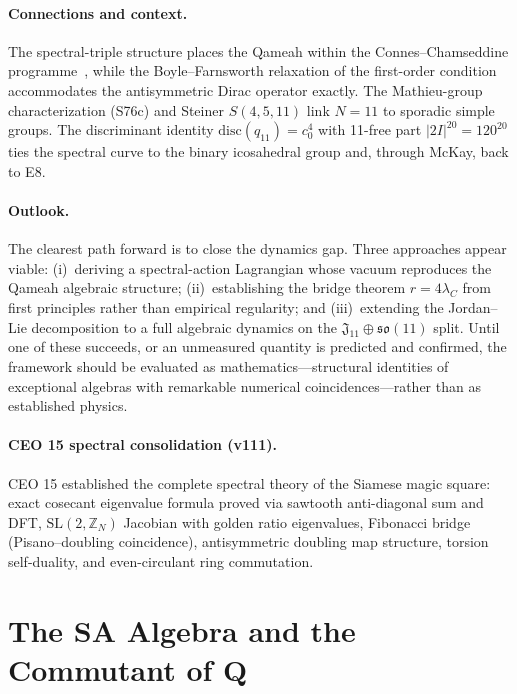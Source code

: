 \documentclass[aps,prd,twocolumn,superscriptaddress,floatfix,nofootinbib]{revtex4-2}
\theoremstyle{definition}
\theoremstyle{remark}
\begin{document}
\paragraph{Connections and context.}
The spectral-triple structure places the Qameah within the Connes--Chamseddine
programme~\cite{chamseddine1996}, while the Boyle--Farnsworth relaxation of the
first-order condition~\cite{boylefarnsworth2014} accommodates the antisymmetric
Dirac operator exactly.  The Mathieu-group characterization (S76c) and Steiner
$S(4,5,11)$ link $N{=}11$ to sporadic simple groups.  The discriminant identity
$\mathrm{disc}(q_{11}) = c_0^4$ with 11-free part $|2I|^{20} = 120^{20}$ ties the
spectral curve to the binary icosahedral group and, through McKay, back to E8.

\paragraph{Outlook.}
The clearest path forward is to close the dynamics gap.  Three approaches appear
viable: (i)~deriving a spectral-action Lagrangian whose vacuum reproduces the
Qameah algebraic structure; (ii)~establishing the bridge theorem $r = 4\lambda_C$
from first principles rather than empirical regularity; and
(iii)~extending the Jordan--Lie decomposition to a full algebraic dynamics on the
$\mathfrak{J}_{11} \oplus \mathfrak{so}(11)$ split.  Until one of these succeeds,
or an unmeasured quantity is predicted and confirmed, the framework should be
evaluated as mathematics---structural identities of exceptional algebras with
remarkable numerical coincidences---rather than as established physics.

\paragraph{CEO 15 spectral consolidation (v111).}
CEO 15 established the complete spectral theory of the Siamese magic square:
exact cosecant eigenvalue formula proved via sawtooth anti-diagonal sum and DFT,
$\mathrm{SL}(2,\mathbb{Z}_N)$ Jacobian with golden ratio eigenvalues,
Fibonacci bridge (Pisano--doubling coincidence), antisymmetric doubling map structure,
torsion self-duality, and even-circulant ring commutation.

\section{The SA Algebra and the Commutant of Q}
\label{sec:sa-algebra}
\end{document}
